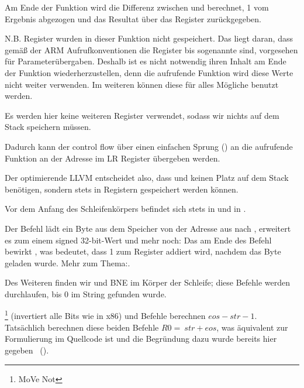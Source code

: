 Am Ende der Funktion wird die Differenz zwischen  und 
berechnet, 1 vom Ergebnis abgezogen und das Resultat über das Register 
zurückgegeben.

N.B. Register wurden in dieser Funktion nicht gespeichert.
Das liegt daran, dass gemäß der ARM Aufrufkonventionen die Register  bis
 sogenannte  sind, vorgesehen für Parameterübergaben.
Deshalb ist es nicht notwendig ihren Inhalt am Ende der Funktion
wiederherzustellen, denn die aufrufende Funktion wird diese Werte nicht weiter
verwenden. 
Im weiteren können diese für alles Mögliche benutzt werden.

Es werden hier keine weiteren Register verwendet, sodass wir nichts auf dem
Stack speichern müssen. 

Dadurch kann der control flow über einen einfachen Sprung () an die
aufrufende Funktion an der Adresse im \ac{LR} Register übergeben werden.

\mysubparagraph{\OptimizingXcodeIV (\ThumbMode)}


Der optimierende LLVM entscheidet also, dass  und  keinen Platz
auf dem Stack benötigen, sondern stets in Registern gespeichert werden können. 

Vor dem Anfang des Schleifenkörpers befindet sich  stets in  und
 in .

Der Befehl  lädt ein Byte aus dem Speicher von der
Adresse aus  nach , erweitert es zum einem signed 32-bit-Wert und
mehr noch: Das  am Ende des Befehl bewirkt ,
was bedeutet, dass 1 zum Register  addiert wird, nachdem das Byte geladen
wurde.
Mehr zum Thema:. 

Des Weiteren finden wir \CMP und \ac{BNE} im Körper der Schleife; diese Befehle
werden durchlaufen, bis 0 im String gefunden wurde.

\footnote{MoVe Not} (invertiert alle Bits wie \NOT in x86) und \ADD
Befehle berechnen $eos - str - 1$.
Tatsächlich berechnen diese beiden Befehle $R0 =
~str + eos$, was äquivalent zur Formulierung im Quellcode ist und die Begründung
dazu wurde bereits hier gegeben ~().

